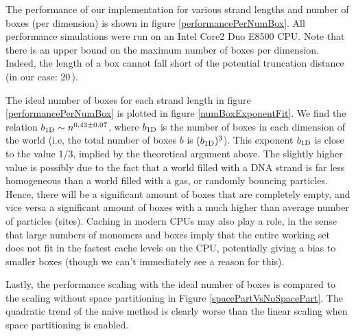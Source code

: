 



The performance of our implementation for various strand lengths and number of boxes (per dimension) is shown in figure \ref{performancePerNumBox}. All performance simulations were run on an Intel Core2 Duo E8500 CPU. Note that there is an upper bound on the maximum number of boxes per dimension. Indeed, the length of a box cannot fall short of the potential truncation distance (in our case: $20$\,\Angstrom).

The ideal number of boxes for each strand length in figure \ref{performancePerNumBox} is plotted in figure \ref{numBoxExponentFit}. We find the relation ${b_\text{1D}} \sim n^{0.43 \pm 0.07}$, where ${b_\text{1D}}$ is the number of boxes in each dimension of the world (i.e, the total number of boxes $b$ is $({b_\text{1D}})^3$).
This exponent ${b_\text{1D}}$ is close to the value 1/3, implied by the theoretical argument above. The slightly higher value is possibly due to the fact that a world filled with a DNA strand is far less homogeneous than a world filled with a gas, or randomly bouncing particles.
Hence, there will be a significant amount of boxes that are completely empty, and vice versa a significant amount of boxes with a much higher than average number of particles (sites).
Caching in modern CPUs may also play a role, in the sense that large numbers of monomers and boxes imply that the entire working set does not fit in the fastest cache levels on the CPU, potentially giving a bias to smaller boxes (though we can't immediately see a reason for this).

Lastly, the performance scaling with the ideal number of boxes is compared to the scaling without space partitioning in Figure \ref{spacePartVsNoSpacePart}. The quadratic trend of the naive method is clearly worse than the linear scaling when space partitioning is enabled.

